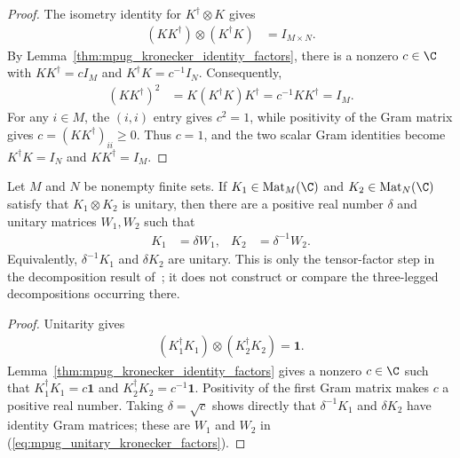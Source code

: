 \begin{proof}\leanok
    The isometry identity for $K^\dagger\otimes K$ gives
    \begin{align}
        (KK^\dagger)\otimes(K^\dagger K) & =I_{M\times N}.
    \end{align}
    By Lemma~\ref{thm:mpug_kronecker_identity_factors}, there is a
    nonzero $c\in\C$ with $KK^\dagger=cI_M$ and
    $K^\dagger K=c^{-1}I_N$. Consequently,
    \begin{align}
        (KK^\dagger)^2
         & =K(K^\dagger K)K^\dagger
        =c^{-1}KK^\dagger=I_M.
    \end{align}
    For any $i\in M$, the $(i,i)$ entry gives $c^2=1$, while positivity
    of the Gram matrix gives $c=(KK^\dagger)_{ii}\geq0$.
    Thus $c=1$, and the two scalar Gram identities become
    $K^\dagger K=I_N$ and $KK^\dagger=I_M$.
\end{proof}
\begin{lemma}
    \label{thm:mpug_unitary_kronecker_factors}
    \leanok
    Let $M$ and $N$ be nonempty finite sets. If
    $K_1\in\operatorname{Mat}_M(\C)$ and
    $K_2\in\operatorname{Mat}_N(\C)$ satisfy that $K_1\otimes K_2$ is
    unitary, then there are a positive real number $\delta$ and unitary
    matrices $W_1,W_2$ such that
    \begin{align}
        K_1 & =\delta W_1, & K_2 & =\delta^{-1}W_2.
        \label{eq:mpug_unitary_kronecker_factors}
    \end{align}
    Equivalently, $\delta^{-1}K_1$ and $\delta K_2$ are unitary.
    This is only the tensor-factor step in the decomposition result
    of~\cite{FrancoRubio2025MPUGauging}; it does not construct or compare the
    three-legged decompositions occurring there.
\end{lemma}

\begin{proof}\leanok
    Unitarity gives
    \begin{align}
        (K_1^\dagger K_1)\otimes(K_2^\dagger K_2)=\mathbf 1.
    \end{align}
    Lemma~\ref{thm:mpug_kronecker_identity_factors} gives a nonzero
    $c\in\C$ such that
    $K_1^\dagger K_1=c\mathbf 1$ and
    $K_2^\dagger K_2=c^{-1}\mathbf 1$. Positivity of the first Gram matrix
    makes $c$ a positive real number. Taking $\delta=\sqrt c$ shows directly
    that $\delta^{-1}K_1$ and $\delta K_2$ have identity Gram matrices; these
    are $W_1$ and $W_2$ in
    (\ref{eq:mpug_unitary_kronecker_factors}).
\end{proof}


